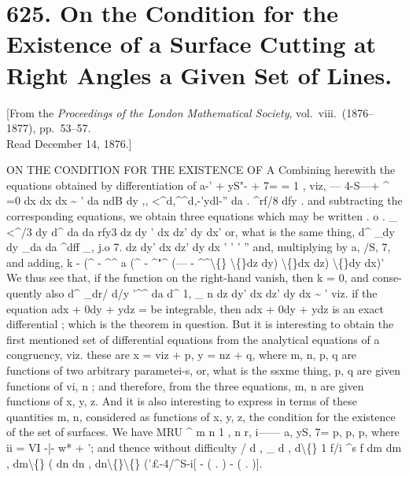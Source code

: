 \documentclass[11pt,a4paper]{book}
\begin{document}
\newpage
\section*{625. On the Condition for the Existence of a Surface Cutting at Right Angles a Given Set of Lines.}

\begin{center}
\small[From the \textit{Proceedings of the London Mathematical Society}, vol.~viii.\ (1876--1877), pp.~53--57.\\Read December 14, 1876.]
\end{center}

ON THE CONDITION FOR THE EXISTENCE OF A
Combining herewith the equations obtained by differentiation of
a-' + yS"- + 7= =
1 ,
viz,
--- 4-S---+ \textasciicircum{} =0
dx
dx
dx \textasciitilde{}
'
da
ndB
dy
,,
<\textasciicircum{}d,\textasciicircum{}\textasciicircum{}d,-'ydl-''
da
.
\textasciicircum{}rf/8
dfy
.
and
subtracting
the
corresponding
equations,
we
obtain
three
equations which may be
written
.
o
.
\_ <\textasciicircum{}/3
dy
d\textasciicircum{}
da
da
rfy3
dz
dy
' dx
dz' dy
dx'
or, what
is the same thing,
d\textasciicircum{} \_dy
dy \_da
da \textasciicircum{}dff \_,
j.o
7.
dz
dy'
dx
dz'
dy
dx
'
'
'
''
and, multiplying by
a,
/S,
7, and adding,
k - (\textasciicircum{} - \textasciicircum{}\textasciicircum{}
a (\textasciicircum{} - \textasciicircum{}"\textasciicircum{}
(--- - \textasciicircum{}\textasciicircum{}\textbackslash\{\}
\textbackslash\{\}dz
dy)
\textbackslash\{\}dx
dz)
\textbackslash\{\}dy
dx)'
We
thus
see
that,
if
the
function
on
the
right-hand
vanish,
then
k = 0,
and
conse-
quently also
d\textasciicircum{} \_dr/
d/y
'\textasciicircum{}\textasciicircum{}
da
d\textasciicircum{}
1, \_ n
dz
dy'
dx
dz'
dy
dx
\textasciitilde{}
'
viz.
if
the
equation
adx + 0dy + ydz =
be
integrable,
then
adx + 0dy + ydz
is
an
exact
differential
;
which
is the theorem
in
question.
But
it
is
interesting
to
obtain
the
first
mentioned
set
of
differential
equations
from
the
analytical
equations
of
a
congruency,
viz.
these
are x = viz + p,
y = nz + q,
where
m,
n,
p,
q
are
functions
of
two
arbitrary
parametei-s,
or,
what
is
the
ssxme
thing,
p,
q
are
given
functions
of
vi,
n
;
and
therefore,
from
the
three
equations,
m, n
are
given
functions
of
x,
y,
z.
And
it
is
also
interesting
to
express
in
terms
of
these
quantities
m,
n,
considered
as
functions
of
x,
y,
z,
the
condition
for
the
existence of the
set
of surfaces.
We have
MRU
\textasciicircum{}
m
n
1
,
n
r,
i------
a,
yS, 7= p,
p,
p, where
ii = VI
-|- w* + \guillemotleft{}';
and thence without
difficulty
/
d
,
\_ d
,
d\textbackslash\{\}
1
f/i
\textasciicircum{}s f
dm
dm
, dm\textbackslash\{\}
(
dn
dn
, dn\textbackslash\{\}\textbackslash\{\}
('\pounds{}-4/\textasciicircum{}S-i[
-
(
.
)
-
(
.
)].
\end{document}
